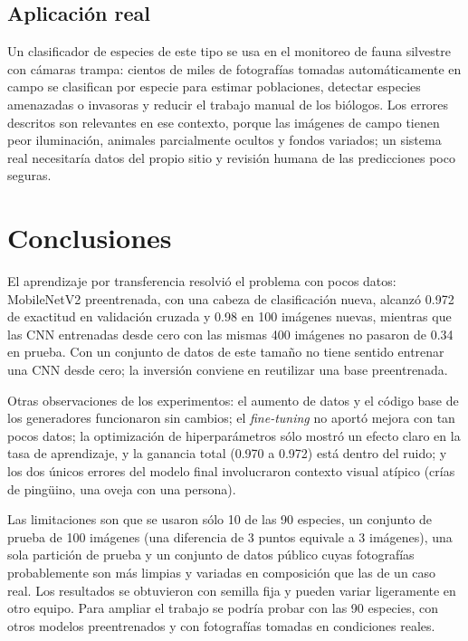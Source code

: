 \documentclass[11pt,letterpaper]{article}
\begin{document}
\subsection{Aplicación real}

Un clasificador de especies de este tipo se usa en el monitoreo de fauna silvestre con cámaras trampa: cientos de miles de fotografías tomadas automáticamente en campo se clasifican por especie para estimar poblaciones, detectar especies amenazadas o invasoras y reducir el trabajo manual de los biólogos. Los errores descritos son relevantes en ese contexto, porque las imágenes de campo tienen peor iluminación, animales parcialmente ocultos y fondos variados; un sistema real necesitaría datos del propio sitio y revisión humana de las predicciones poco seguras.

\section{Conclusiones}

El aprendizaje por transferencia resolvió el problema con pocos datos: MobileNetV2 preentrenada, con una cabeza de clasificación nueva, alcanzó 0.972 de exactitud en validación cruzada y 0.98 en 100 imágenes nuevas, mientras que las CNN entrenadas desde cero con las mismas 400 imágenes no pasaron de 0.34 en prueba. Con un conjunto de datos de este tamaño no tiene sentido entrenar una CNN desde cero; la inversión conviene en reutilizar una base preentrenada.

Otras observaciones de los experimentos: el aumento de datos y el código base de los generadores funcionaron sin cambios; el \textit{fine-tuning} no aportó mejora con tan pocos datos; la optimización de hiperparámetros sólo mostró un efecto claro en la tasa de aprendizaje, y la ganancia total (0.970 a 0.972) está dentro del ruido; y los dos únicos errores del modelo final involucraron contexto visual atípico (crías de pingüino, una oveja con una persona).

Las limitaciones son que se usaron sólo 10 de las 90 especies, un conjunto de prueba de 100 imágenes (una diferencia de 3 puntos equivale a 3 imágenes), una sola partición de prueba y un conjunto de datos público cuyas fotografías probablemente son más limpias y variadas en composición que las de un caso real. Los resultados se obtuvieron con semilla fija y pueden variar ligeramente en otro equipo. Para ampliar el trabajo se podría probar con las 90 especies, con otros modelos preentrenados y con fotografías tomadas en condiciones reales.

\end{document}
